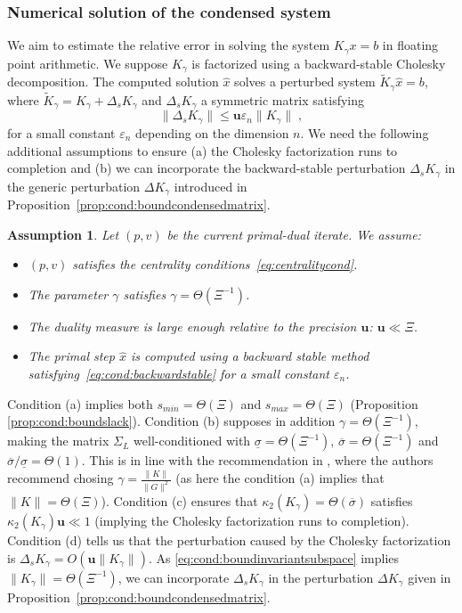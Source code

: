 \documentclass[smallextended]{svjour3}
\newtheorem{assumption}[theorem]{Assumption}
\newcommand{\cond}{\kappa_2}
\newcommand{\epstol}{\mathbf{u}}
\begin{document}
\subsubsection{Numerical solution of the condensed system}
We aim to estimate the relative error
in solving the system $K_\gamma x = b$ in floating
point arithmetic. We suppose $K_\gamma$ is factorized using
a backward-stable Cholesky decomposition. The computed
solution $\widehat{x}$ solves a perturbed system
$\widetilde{K}_\gamma \widehat{x} = b$, where $\widetilde{K}_\gamma
= K_\gamma + \Delta_s K_\gamma$ and $\Delta_s K_\gamma$ a symmetric matrix satisfying
\begin{equation}
  \label{eq:cond:backwardstable}
  \|\Delta_s K_\gamma\| \leq \epstol \varepsilon_n \|K_\gamma\| \;,
\end{equation}
for a small constant $\varepsilon_n$ depending on the dimension $n$.
We need the following additional assumptions to
ensure (a) the Cholesky factorization runs to completion
and (b) we can incorporate the backward-stable perturbation $\Delta_s K_\gamma$
in the generic perturbation $\Delta K_\gamma$ introduced in
Proposition~\ref{prop:cond:boundcondensedmatrix}.
\begin{assumption} Let $(p, v)$ be the current primal-dual iterate. We assume:
  \begin{itemize}
    \item[(a)] $(p, v)$ satisfies the centrality conditions~\eqref{eq:centralitycond}.
    \item[(b)] The parameter $\gamma$ satisfies $\gamma = \Theta(\Xi^{-1})$.
    \item[(c)] The duality measure is large enough relative to the precision $\epstol$: $\epstol \ll \Xi$.
    \item[(d)] The primal step $\widehat{x}$ is computed using a backward
      stable method satisfying~\eqref{eq:cond:backwardstable} for a small constant
      $\varepsilon_n$.
  \end{itemize}
  \label{hyp:cond:wellcond}
\end{assumption}
Condition (a) implies both
$s_{min} = \Theta(\Xi)$ and $s_{max} = \Theta(\Xi)$ (Proposition \ref{prop:cond:boundslack}).
Condition (b) supposes in addition $\gamma = \Theta(\Xi^{-1})$, making
the matrix $\Sigma_L$ well-conditioned with
$\underline{\sigma} = \Theta(\Xi^{-1})$,
$\overline{\sigma} = \Theta(\Xi^{-1})$ and $\overline{\sigma}/\underline{\sigma} = \Theta(1)$.
This is in line with the recommendation in \cite{golub2003solving},
  where the authors recommend chosing $\gamma = \frac{\|K\|}{\|G\|^2}$
  (as here the condition (a) implies that $\|K \| = \Theta(\Xi)$).
Condition (c) ensures that $\cond(K_\gamma) = \Theta(\overline{\sigma})$
satisfies $\cond(K_\gamma) \epstol \ll 1$
(implying the Cholesky factorization runs to completion).
Condition (d) tells us that the perturbation caused by the Cholesky
factorization is $\Delta_s K_\gamma = O(\epstol \| K_\gamma\|)$. As
\eqref{eq:cond:boundinvariantsubspace} implies $\|K_\gamma \| = \Theta(\Xi^{-1})$,
we can incorporate $\Delta_s K_\gamma$ in the perturbation
$\Delta K_\gamma$ given in Proposition~\ref{prop:cond:boundcondensedmatrix}.
\end{document}
